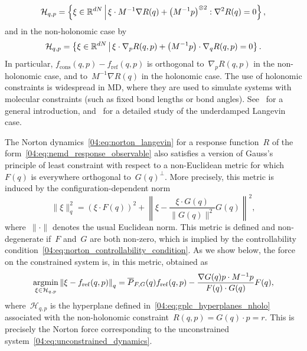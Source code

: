 \begin{equation}
\label{04:eq:gplc_hyperplanes_holo}
\mathcal H_{q,p}=\left\{\xi \in \mathbb{R}^{dN}\,\middle|\,\xi\cdot M^{-1}\nabla R(q) + \left(M^{-1}p\right)^{\otimes 2}:\nabla^2 R(q)=0\right\},
\end{equation}
and in the non-holonomic case by
\begin{equation}
    \label{04:eq:gplc_hyperplanes_nholo}
    \mathcal H_{q,p}=\left\{\xi\in \mathbb{R}^{dN}\,\middle|\, \xi\cdot \nabla_p R(q,p)+\left(M^{-1}p\right)\cdot \nabla_q R(q,p)=0\right\}.
\end{equation}
In particular, $f_{\mathrm{cons}}(q,p)-f_{\mathrm{ref}}(q,p)$ is orthogonal to~$\nabla_p R(q,p)$ in the non-holonomic case, and to~$M^{-1}\nabla R(q)$ in the holonomic case. The use of holonomic constraints is widespread in MD, where they are used to simulate systems with molecular constraints (such as fixed bond lengths or bond angles). See~\cite[Chapter 4]{LM15} for a general introduction, and~\cite{LRS12} for a detailed study of the underdamped Langevin case.

The Norton dynamics~\eqref{04:eq:norton_langevin} for a response function~$R$ of the form~\eqref{04:eq:nemd_response_observable} also satisfies a version of Gauss's principle of least constraint with respect to a non-Euclidean metric for which~$F(q)$ is everywhere orthogonal to~$G(q)^{\perp}$.
More precisely, this metric is induced by the configuration-dependent norm
\begin{equation}
    \label{04:eq:q_metric}
    \|\xi\|^2_q = \left(\xi\cdot F(q)\right)^2 + \left\|\xi-\frac{\xi\cdot G(q)}{\|G(q)\|^2}G(q)\right\|^2,
\end{equation}
where~$\|\cdot\|$ denotes the usual Euclidean norm. This metric is defined and non-degenerate if~$F$ and~$G$ are both non-zero, which is implied by the controllability condition~\eqref{04:eq:norton_controllability_condition}. As we show below, the force on the constrained system is, in this metric, obtained as
\begin{equation}
    \label{04:eq:variational_problem}
    \underset{\xi\in \mathcal{H}_{q,p}}{\operatorname*{argmin}} \left\| \xi- f_{\mathrm{ref}}(q,p)\right\|_q = \overline{P}_{F,G}(q) f_{\mathrm{ref}}(q,p) - \frac{\nabla G(q) p\cdot M^{-1}p}{F(q)\cdot G(q)}F(q),
\end{equation}
where~$\mathcal{H}_{q,p}$ is the hyperplane defined in~\eqref{04:eq:gplc_hyperplanes_nholo} associated with the non-holonomic constraint~$R(q,p)=G(q)\cdot p=r$. This is precisely the Norton force corresponding to the unconstrained system~\eqref{04:eq:unconstrained_dynamics}.

